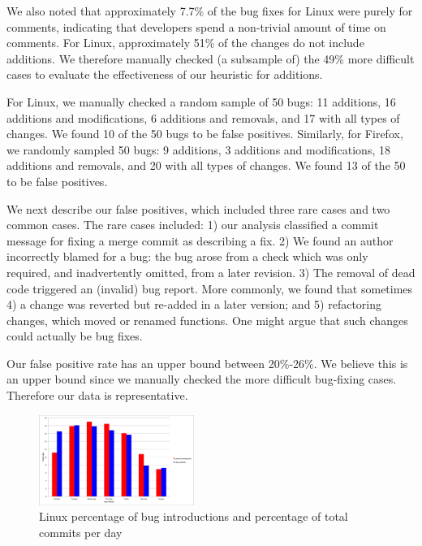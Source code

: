 We also noted that approximately 7.7\% of the bug fixes for Linux were
purely for comments, indicating that developers spend a non-trivial
amount of time on comments. For Linux, approximately 51\% of the
changes do not include additions. We therefore manually checked (a
subsample of) the 49\% more difficult cases to evaluate the
effectiveness of our heuristic for additions.

For Linux, we manually checked a random sample of 50 bugs: 11
additions, 16 additions and modifications, 6 additions and removals,
and 17 with all types of changes. We found 10 of the 50 bugs to be
false positives. Similarly, for Firefox, we randomly sampled 50 bugs:
9 additions, 3 additions and modifications, 18 additions and removals,
and 20 with all types of changes. We found 13 of the 50 to be false
positives. 

We next describe our false positives, which included three rare cases
and two common cases. The rare cases included: 1) our analysis
classified a commit message for fixing a merge commit as describing a
fix. 2) We found an author incorrectly blamed for a bug: the bug arose
from a check which was only required, and inadvertently omitted, from
a later revision. 3) The removal of dead code triggered an (invalid)
bug report. More commonly, we found that sometimes 4) a change was
reverted but re-added in a later version; and 5) refactoring changes,
which moved or renamed functions. One might argue that such changes
could actually be bug fixes.

 
Our false positive rate has an upper bound between 20\%-26\%. We
believe this is an upper bound since we manually checked the more
difficult bug-fixing cases. Therefore our data is representative.

\begin{figure}
\begin{center}
\includegraphics[width=0.45\textwidth]{linux_bug_introduction_day_of_week.png}
\end{center}
\caption{Linux percentage of bug introductions and percentage of total commits per day}
\label{fig-linux-weekday}
\end{figure}

